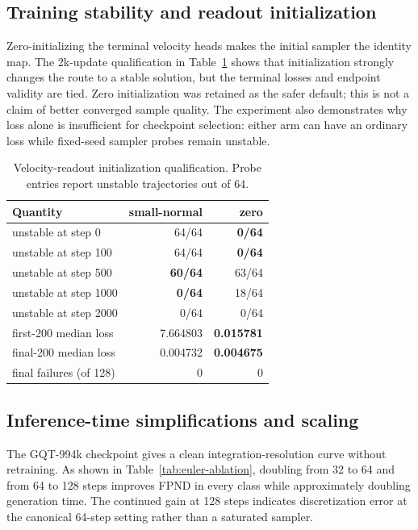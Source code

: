 \documentclass[10pt]{article}
\begin{document}
\subsection{Training stability and readout initialization}

Zero-initializing the terminal velocity heads makes the initial sampler the identity map.
The 2k-update qualification in Table~\ref{tab:init-ablation} shows that initialization
strongly changes the route to a stable solution, but the terminal losses and endpoint
validity are tied. Zero initialization was retained as the safer default; this is not a
claim of better converged sample quality. The experiment also demonstrates why loss
alone is insufficient for checkpoint selection: either arm can have an ordinary loss
while fixed-seed sampler probes remain unstable.

\begin{table}[H]
\centering
\caption{Velocity-readout initialization qualification. Probe entries report unstable
trajectories out of 64.}
\label{tab:init-ablation}
\small
\begin{tabular}{lrr}
\toprule
Quantity & small-normal & zero \\
\midrule
unstable at step 0      & 64/64 & \textbf{0/64} \\
unstable at step 100    & 64/64 & \textbf{0/64} \\
unstable at step 500    & \textbf{60/64} & 63/64 \\
unstable at step 1000   & \textbf{0/64} & 18/64 \\
unstable at step 2000   & 0/64 & 0/64 \\
first-200 median loss   & 7.664803 & \textbf{0.015781} \\
final-200 median loss   & 0.004732 & \textbf{0.004675} \\
final failures (of 128) & 0 & 0 \\
\bottomrule
\end{tabular}
\end{table}

\subsection{Inference-time simplifications and scaling}

The GQT-994k checkpoint gives a clean integration-resolution curve without retraining.
As shown in Table~\ref{tab:euler-ablation}, doubling from 32 to 64 and from 64 to 128
steps improves FPND in every class while approximately doubling generation time. The
continued gain at 128 steps indicates discretization error at the canonical 64-step
setting rather than a saturated sampler.
\end{document}

